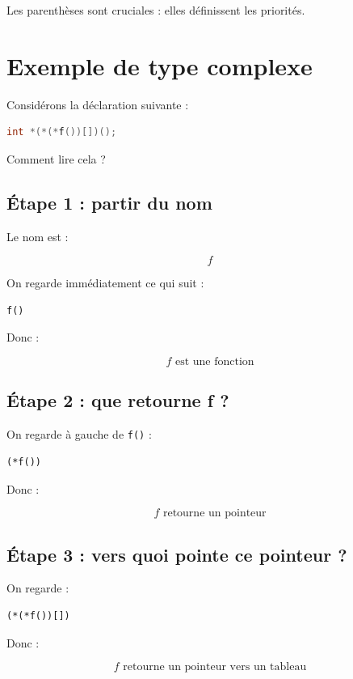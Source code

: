 Les parenthèses sont cruciales :
elles définissent les priorités.

\section{Exemple de type complexe}

Considérons la déclaration suivante :

\begin{lstlisting}[language=C]
int *(*(*f())[])();
\end{lstlisting}

Comment lire cela ?

\subsection{Étape 1 : partir du nom}

Le nom est :

\[
f
\]

On regarde immédiatement ce qui suit :

\begin{lstlisting}
f()
\end{lstlisting}

Donc :

\[
f \text{ est une fonction}
\]

\subsection{Étape 2 : que retourne f ?}

On regarde à gauche de \texttt{f()} :

\begin{lstlisting}
(*f())
\end{lstlisting}

Donc :

\[
f \text{ retourne un pointeur}
\]

\subsection{Étape 3 : vers quoi pointe ce pointeur ?}

On regarde :

\begin{lstlisting}
(*(*f())[])
\end{lstlisting}

Donc :

\[
f \text{ retourne un pointeur vers un tableau}
\]

